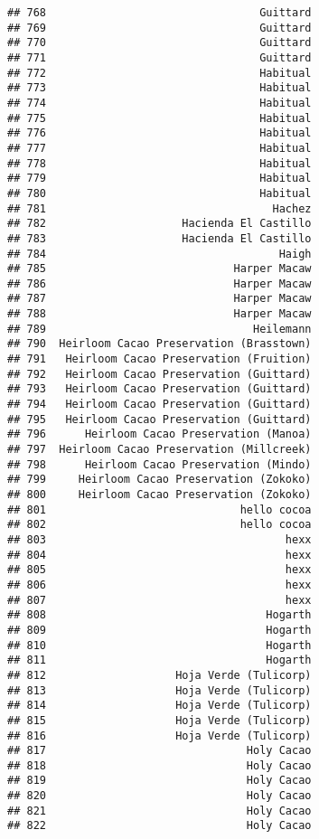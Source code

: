 \documentclass[
]{article}
\begin{document}
\begin{verbatim}
## 768                                 Guittard
## 769                                 Guittard
## 770                                 Guittard
## 771                                 Guittard
## 772                                 Habitual
## 773                                 Habitual
## 774                                 Habitual
## 775                                 Habitual
## 776                                 Habitual
## 777                                 Habitual
## 778                                 Habitual
## 779                                 Habitual
## 780                                 Habitual
## 781                                   Hachez
## 782                     Hacienda El Castillo
## 783                     Hacienda El Castillo
## 784                                    Haigh
## 785                             Harper Macaw
## 786                             Harper Macaw
## 787                             Harper Macaw
## 788                             Harper Macaw
## 789                                Heilemann
## 790  Heirloom Cacao Preservation (Brasstown)
## 791   Heirloom Cacao Preservation (Fruition)
## 792   Heirloom Cacao Preservation (Guittard)
## 793   Heirloom Cacao Preservation (Guittard)
## 794   Heirloom Cacao Preservation (Guittard)
## 795   Heirloom Cacao Preservation (Guittard)
## 796      Heirloom Cacao Preservation (Manoa)
## 797  Heirloom Cacao Preservation (Millcreek)
## 798      Heirloom Cacao Preservation (Mindo)
## 799     Heirloom Cacao Preservation (Zokoko)
## 800     Heirloom Cacao Preservation (Zokoko)
## 801                              hello cocoa
## 802                              hello cocoa
## 803                                     hexx
## 804                                     hexx
## 805                                     hexx
## 806                                     hexx
## 807                                     hexx
## 808                                  Hogarth
## 809                                  Hogarth
## 810                                  Hogarth
## 811                                  Hogarth
## 812                    Hoja Verde (Tulicorp)
## 813                    Hoja Verde (Tulicorp)
## 814                    Hoja Verde (Tulicorp)
## 815                    Hoja Verde (Tulicorp)
## 816                    Hoja Verde (Tulicorp)
## 817                               Holy Cacao
## 818                               Holy Cacao
## 819                               Holy Cacao
## 820                               Holy Cacao
## 821                               Holy Cacao
## 822                               Holy Cacao

\end{verbatim}
\end{document}
